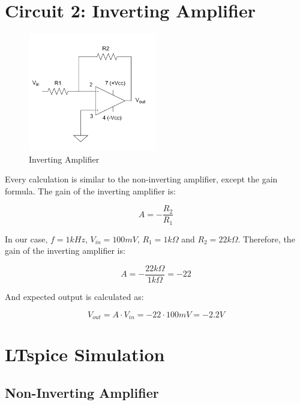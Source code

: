 \newpage
\thispagestyle{plain}

\section{Circuit 2: Inverting Amplifier}

\begin{figure}[h]
    \centering
    \includegraphics[width=0.5\textwidth]{assets/inverting.png}
    \caption{Inverting Amplifier}
    \label{fig:inverting-amplifier}
\end{figure}

Every calculation is similar to the non-inverting amplifier, except the gain formula. The gain of the inverting amplifier is:

\begin{equation}
    A = -\frac{R_2}{R_1}
\end{equation}

In our case, $f = 1kHz$, $V_{in} = 100mV$, $R_1 = 1k\Omega$ and $R_2 = 22k\Omega$. Therefore, the gain of the inverting amplifier is:

\begin{equation}
    A = -\frac{22k\Omega}{1k\Omega} = -22
\end{equation}

\noindent And expected output is calculated as:

\begin{equation}
    V_{out} = A \cdot V_{in} = -22 \cdot 100mV = -2.2V
\end{equation}

\newpage
\thispagestyle{plain}

\section{LTspice Simulation}

\subsection{Non-Inverting Amplifier}

